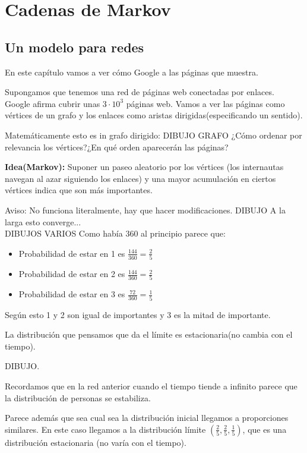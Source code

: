 \chapter{Cadenas de Markov}

\section{Un modelo para redes}
En este capítulo vamos a ver cómo Google a las páginas que muestra.

Supongamos que tenemos una red de páginas web conectadas por enlaces.\\
Google afirma cubrir unas $3\cdot 10^3$ páginas web.
Vamos a ver las páginas como vértices de un grafo y los enlaces como aristas dirigidas(especificando un sentido).

Matemáticamente esto es in grafo dirigido:
DIBUJO GRAFO
¿Cómo ordenar por relevancia los vértices?¿En qué orden aparecerán las páginas?


\textbf{Idea(Markov):} Suponer un paseo aleatorio por los vértices (los internautas navegan al azar siguiendo los enlaces) y una mayor acumulación en ciertos vértices indica que son más importantes.


Aviso: No funciona literalmente, hay que hacer modificaciones.
DIBUJO
A la larga esto converge...\\
DIBUJOS VARIOS
Como había 360 al principio parece que:


\begin{itemize}
	\item Probabilidad de estar en 1 es $\frac{144}{360} = \frac{2}{5}$
	\item Probabilidad de estar en 2 es $\frac{144}{360} = \frac{2}{5}$
	\item Probabilidad de estar en 3 es $\frac{72}{360} = \frac{1}{5}$
\end{itemize}
	Según esto 1 y 2 son igual de importantes y 3 es la mitad de importante.
	
	La distribución que pensamos que da el límite es estacionaria(no cambia con el tiempo).
	
	DIBUJO.


Recordamos que en la red anterior cuando el tiempo tiende a infinito parece que la distribución de personas se estabiliza.

Parece además que sea cual sea la distribución inicial llegamos a proporciones similares. En este caso llegamos a la distribución límite $(\frac{2}{5},\frac{2}{5},\frac{1}{5})$, que es una distribución estacionaria (no varía con el tiempo).

